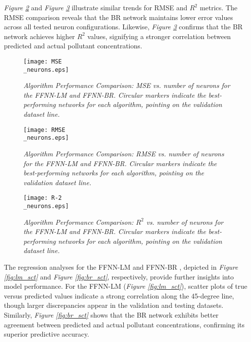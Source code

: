 \documentclass[10pt]{article}
\begin{document}
	\textit{Figure \ref{fig:comparisonRMSE}} and \textit{Figure \ref{fig:comparisonR2}} illustrate similar trends for RMSE and $R^2$ metrics. The RMSE comparison reveals that the BR network maintains lower error values across all tested neuron configurations. Likewise, \textit{Figure \ref{fig:comparisonR2}} confirms that the BR network achieves higher $R^2$ values, signifying a stronger correlation between predicted and actual pollutant concentrations.
	
	\begin{figure}[H]
		\centering
		\texttt{[image: MSE\\\_neurons.eps]}
		\caption{\textit{Algorithm Performance Comparison: MSE vs. number of neurons for the FFNN-LM and FFNN-BR. Circular markers indicate the best-performing networks for each algorithm, pointing on the validation dataset line.}}
		\label{fig:comparisonMSE}
	\end{figure}
	
	\begin{figure}[H]
		\centering
		\texttt{[image: RMSE\\\_neurons.eps]}
		\caption{\textit{Algorithm Performance Comparison: RMSE vs. number of neurons for the FFNN-LM and FFNN-BR. Circular markers indicate the best-performing networks for each algorithm, pointing on the validation dataset line.}}
		\label{fig:comparisonRMSE}
	\end{figure}
	
	\begin{figure}[H]
		\centering
		\texttt{[image: R-2\\\_neurons.eps]}
		\caption{\textit{Algorithm Performance Comparison: \(R^2\) vs. number of neurons for the FFNN-LM and FFNN-BR. Circular markers indicate the best-performing networks for each algorithm, pointing on the validation dataset line.}}
		\label{fig:comparisonR2}
	\end{figure}
	
	The regression analyses for the FFNN-LM and FFNN-BR , depicted in \textit{Figure \ref{fig:lm_sct}} and \textit{Figure \ref{fig:br_sct}}, respectively, provide further insights into model performance. For the FFNN-LM (\textit{Figure \ref{fig:lm_sct}}), scatter plots of true versus predicted values indicate a strong correlation along the 45-degree line, though larger discrepancies appear in the validation and testing datasets. Similarly, \textit{Figure \ref{fig:br_sct}} shows that the BR network exhibits better agreement between predicted and actual pollutant concentrations, confirming its superior predictive accuracy.
	
\end{document}
